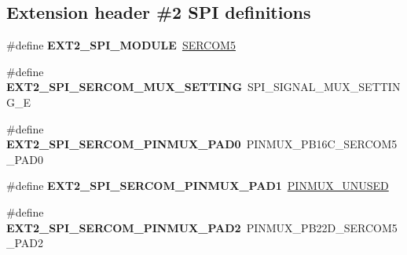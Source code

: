 \subsection*{Extension header \#2 S\+P\+I definitions}
\begin{DoxyCompactItemize}
\item 
\hypertarget{group__saml21__xplained__pro__features__group_ga61fcf212ea571b4b7570423bb3ad23ba}{}\#define {\bfseries E\+X\+T2\+\_\+\+S\+P\+I\+\_\+\+M\+O\+D\+U\+L\+E}~\hyperlink{group___s_a_m_l21_j18_a__base_ga8785a316e608cb0a218f2a59655d6037}{S\+E\+R\+C\+O\+M5}\label{group__saml21__xplained__pro__features__group_ga61fcf212ea571b4b7570423bb3ad23ba}

\item 
\hypertarget{group__saml21__xplained__pro__features__group_gaba3b1b2adf5294f49f0729e557139b48}{}\#define {\bfseries E\+X\+T2\+\_\+\+S\+P\+I\+\_\+\+S\+E\+R\+C\+O\+M\+\_\+\+M\+U\+X\+\_\+\+S\+E\+T\+T\+I\+N\+G}~S\+P\+I\+\_\+\+S\+I\+G\+N\+A\+L\+\_\+\+M\+U\+X\+\_\+\+S\+E\+T\+T\+I\+N\+G\+\_\+\+E\label{group__saml21__xplained__pro__features__group_gaba3b1b2adf5294f49f0729e557139b48}

\item 
\hypertarget{group__saml21__xplained__pro__features__group_ga6e34e325818f6d4e8227c8ee7220a5fa}{}\#define {\bfseries E\+X\+T2\+\_\+\+S\+P\+I\+\_\+\+S\+E\+R\+C\+O\+M\+\_\+\+P\+I\+N\+M\+U\+X\+\_\+\+P\+A\+D0}~P\+I\+N\+M\+U\+X\+\_\+\+P\+B16\+C\+\_\+\+S\+E\+R\+C\+O\+M5\+\_\+\+P\+A\+D0\label{group__saml21__xplained__pro__features__group_ga6e34e325818f6d4e8227c8ee7220a5fa}

\item 
\hypertarget{group__saml21__xplained__pro__features__group_ga4adc397a5b4274c6d63a37dd82073b86}{}\#define {\bfseries E\+X\+T2\+\_\+\+S\+P\+I\+\_\+\+S\+E\+R\+C\+O\+M\+\_\+\+P\+I\+N\+M\+U\+X\+\_\+\+P\+A\+D1}~\hyperlink{group__asfdoc__sam0__sercom__usart__group_gaffde9ff712058ef836127e1f3368889e}{P\+I\+N\+M\+U\+X\+\_\+\+U\+N\+U\+S\+E\+D}\label{group__saml21__xplained__pro__features__group_ga4adc397a5b4274c6d63a37dd82073b86}

\item 
\hypertarget{group__saml21__xplained__pro__features__group_ga80742baa0460438ed9dfc52ed4cc875c}{}\#define {\bfseries E\+X\+T2\+\_\+\+S\+P\+I\+\_\+\+S\+E\+R\+C\+O\+M\+\_\+\+P\+I\+N\+M\+U\+X\+\_\+\+P\+A\+D2}~P\+I\+N\+M\+U\+X\+\_\+\+P\+B22\+D\+\_\+\+S\+E\+R\+C\+O\+M5\+\_\+\+P\+A\+D2\label{group__saml21__xplained__pro__features__group_ga80742baa0460438ed9dfc52ed4cc875c}


\end{DoxyCompactItemize}
